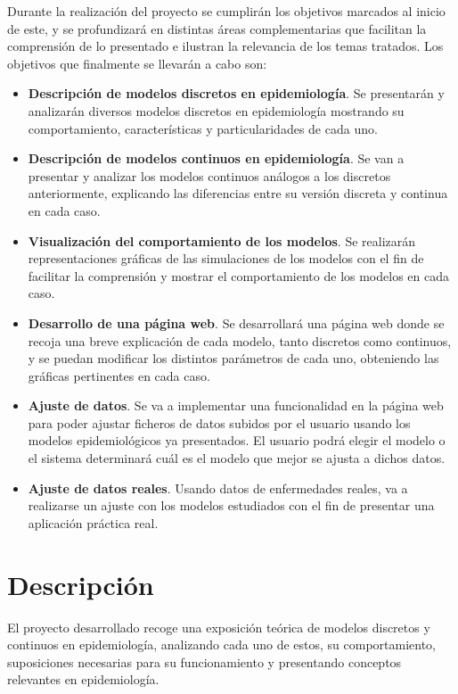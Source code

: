 Durante la realización del proyecto se cumplirán los objetivos marcados al inicio de este, y se profundizará en distintas áreas complementarias que facilitan la comprensión de lo presentado e ilustran la relevancia de los temas tratados. Los objetivos que finalmente se llevarán a cabo son:

\begin{itemize}
\item \textbf{Descripción de modelos discretos en epidemiología}. Se presentarán y analizarán diversos modelos discretos en epidemiología mostrando su comportamiento, características y particularidades de cada uno.
\item \textbf{Descripción de modelos continuos en epidemiología}. Se van a presentar y analizar los modelos continuos análogos a los discretos anteriormente, explicando las diferencias entre su versión discreta y continua en cada caso.
\item \textbf{Visualización del comportamiento de los modelos}. Se realizarán representaciones gráficas de las simulaciones de los modelos con el fin de facilitar la comprensión y mostrar el comportamiento de los modelos en cada caso.
\item \textbf{Desarrollo de una página web}. Se desarrollará una página web donde se recoja una breve explicación de cada modelo, tanto discretos como continuos, y se puedan modificar los distintos parámetros de cada uno, obteniendo las gráficas pertinentes en cada caso.
\item \textbf{Ajuste de datos}. Se va a implementar una funcionalidad en la página web para poder ajustar ficheros de datos subidos por el usuario usando los modelos epidemiológicos ya presentados. El usuario podrá elegir el modelo o el sistema determinará cuál es el modelo que mejor se ajusta a dichos datos.
\item \textbf{Ajuste de datos reales}. Usando datos de enfermedades reales, va a realizarse un ajuste con los modelos estudiados con el fin de presentar una aplicación práctica real.
\end{itemize}


\section{Descripción}

El proyecto desarrollado recoge una exposición teórica de modelos discretos y continuos en epidemiología, analizando cada uno de estos, su comportamiento, suposiciones necesarias para su funcionamiento y presentando conceptos relevantes en epidemiología.

